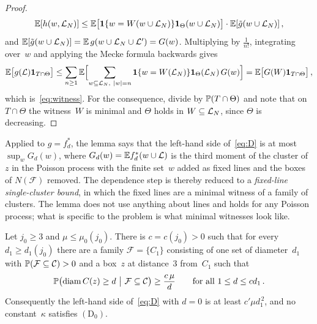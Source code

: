 \documentclass[11pt,letterpaper]{article}
\DeclareMathOperator{\diam}{diam}
\begin{document}
\begin{proof}
\begin{equation*}
  \E[h(w,\cL_N)]\le\E\bigl[\1\{w=W(w\cup\cL_N)\}\1_\Theta(w\cup\cL_N)\bigr]\cdot\E[\tilde g(w\cup\cL_N)]\,,
\end{equation*}
and $\E[\tilde g(w\cup\cL_N)]=\E\,g(w\cup\cL_N\cup\cL')=G(w)$. Multiplying by $\frac1{n!}$, integrating over~$w$ and applying the Mecke formula backwards gives
\begin{equation*}
  \E\bigl[g(\cL)\1_{T\cap\Theta}\bigr]\le\sum_{n\ge1}\E\Bigl[\sum_{w\subseteq\cL_N,\ \lvert w\rvert=n}\1\{w=W(\cL_N)\}\1_\Theta(\cL_N)\,G(w)\Bigr]=\E\bigl[G(W)\1_{T\cap\Theta}\bigr]\,,
\end{equation*}
which is~\eqref{eq:witness}. For the consequence, divide by $\P(T\cap\Theta)$ and note that on $T\cap\Theta$ the witness~$W$ is minimal and $\Theta$ holds in $W\subseteq\cL_N$, since $\Theta$ is decreasing.
\end{proof}

Applied to $g=f^*_d$, the lemma says that the left-hand side of~\eqref{eq:D} is at most $\sup_wG_d(w)$, where $G_d(w)=\E f^*_d(w\cup\cL)$ is the third moment of the cluster of~$z$ in the Poisson process with the finite set~$w$ added as fixed lines and the boxes of $N(\mathcal F)$ removed. The dependence step is thereby reduced to a \emph{fixed-line single-cluster bound}, in which the fixed lines are a minimal witness of a family of clusters. The lemma does not use anything about lines and holds for any Poisson process; what is specific to the problem is what minimal witnesses look like.

\begin{proposition}
\label{prop:D0false}
Let $j_0\ge3$ and $\mu\le\mu_0(j_0)$. There is $c=c(j_0)>0$ such that for every $d_1\ge d_1(j_0)$ there are a family $\mathcal F=\{C_1\}$ consisting of one set of diameter~$d_1$ with $\P(\mathcal F\subseteq\mathcal C)>0$ and a box~$z$ at distance~$3$ from~$C_1$ such that
\begin{equation}
\label{eq:relay}
  \P\bigl(\diam C(z)\ge d\ \big\vert\ \mathcal F\subseteq\mathcal C\bigr)\ge\frac{c\,\mu}{d}\qquad\text{for all }1\le d\le cd_1\,.
\end{equation}
Consequently the left-hand side of~\eqref{eq:D} with $d=0$ is at least $c'\mu d_1^{\,2}$, and no constant~$\kappa$ satisfies $\mathrm{(D_0)}$.
\end{proposition}
\end{document}
